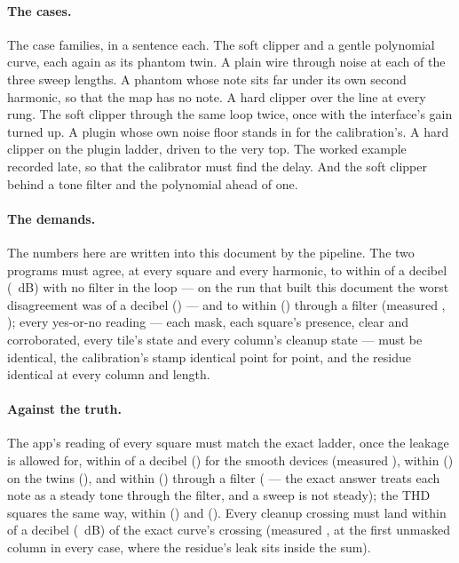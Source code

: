 \documentclass[11pt,a4paper]{article}
\begin{document}
\paragraph{The cases.} The case families, in a sentence each. The soft clipper and a gentle
polynomial curve, each again as its phantom twin. A plain wire through
noise at each of the three sweep lengths. A phantom whose note sits far
under its own second harmonic, so that the map has no note. A hard
clipper over the line at every rung. The soft clipper through the same
loop twice, once with the interface's gain turned up. A plugin whose own
noise floor stands in for the calibration's. A hard clipper on the
plugin ladder, driven to the very top. The worked example recorded late,
so that the calibrator must find the delay. And the soft clipper behind a
tone filter and the polynomial ahead of one.

\paragraph{The demands.} The numbers here are written into this document
by the pipeline. The two programs must agree, at every square and every harmonic, to within
\jparitySwiftToleranceWords{} of a decibel (\jparitySwiftTolerance{}~dB)
with no filter in the loop --- on the run that built this document the
worst disagreement was \jparityWorstSwiftWords{} of a decibel
(\jparityWorstSwift{}) --- and to within
\jparitySwiftFilteredToleranceWords{} (\jparitySwiftFilteredTolerance{})
through a filter (measured \jparityWorstSwiftFilteredWords{},
\jparityWorstSwiftFiltered{}); every yes-or-no reading --- each mask,
each square's presence, clear and corroborated, every tile's state and
every column's cleanup state --- must be identical, the calibration's
stamp identical point for point, and the residue identical at every
column and length.

\paragraph{Against the truth.} The app's reading of every square must match the
exact ladder, once the leakage is allowed for, within
\jparityTruthSmoothWords{} of a decibel (\jparityTruthSmooth{}) for the
smooth devices (measured \jparityWorstResidueSmooth{}), within
\jparityTruthPhantomWords{} (\jparityTruthPhantom{}) on the twins
(\jparityWorstResiduePhantom{}), and within
\jparityTruthFilteredWords{} (\jparityTruthFiltered{}) through a filter
(\jparityWorstResidueFiltered{} --- the exact answer treats each note as a
steady tone through the filter, and a sweep is not steady); the THD
squares the same way, within \jparityTHDSmoothWords{}
(\jparityTHDSmooth{}) and \jparityTHDFilteredWords{}
(\jparityTHDFiltered{}). Every cleanup crossing must land within
\jparityCleanupWords{} of a decibel (\jparityCleanup{}~dB) of the exact
curve's crossing (measured \jparityWorstCleanup{}, at the first unmasked
column in every case, where the residue's leak sits inside the sum).
\end{document}
